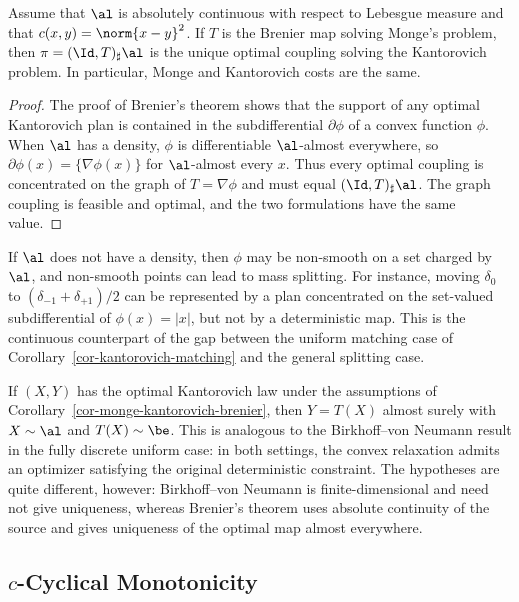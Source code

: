 \begin{cor}\label{cor-monge-kantorovich-brenier}
	Assume that $\al$ is absolutely continuous with respect to Lebesgue measure and that $c(x,y)=\norm{x-y}^2$. If $T$ is the Brenier map solving Monge's problem, then $\pi=(\Id,T)_\sharp\al$ is the unique optimal coupling solving the Kantorovich problem. In particular, Monge and Kantorovich costs are the same.
\end{cor}
\begin{proof}
	The proof of Brenier's theorem shows that the support of any optimal Kantorovich plan is contained in the subdifferential $\partial\phi$ of a convex function $\phi$. When $\al$ has a density, $\phi$ is differentiable $\al$-almost everywhere, so $\partial\phi(x)=\{\nabla\phi(x)\}$ for $\al$-almost every $x$. Thus every optimal coupling is concentrated on the graph of $T=\nabla\phi$ and must equal $(\Id,T)_\sharp\al$. The graph coupling is feasible and optimal, and the two formulations have the same value.
\end{proof}

If $\al$ does not have a density, then $\phi$ may be non-smooth on a set charged by $\al$, and non-smooth points can lead to mass splitting. For instance, moving $\delta_0$ to $(\delta_{-1}+\delta_{+1})/2$ can be represented by a plan concentrated on the set-valued subdifferential of $\phi(x)=|x|$, but not by a deterministic map. This is the continuous counterpart of the gap between the uniform matching case of Corollary~\ref{cor-kantorovich-matching} and the general splitting case.

\begin{rem}
	If $(X,Y)$ has the optimal Kantorovich law under the assumptions of Corollary~\ref{cor-monge-kantorovich-brenier}, then $Y=T(X)$ almost surely with $X\sim\al$ and $T(X)\sim\be$. This is analogous to the Birkhoff--von Neumann result in the fully discrete uniform case: in both settings, the convex relaxation admits an optimizer satisfying the original deterministic constraint. The hypotheses are quite different, however: Birkhoff--von Neumann is finite-dimensional and need not give uniqueness, whereas Brenier's theorem uses absolute continuity of the source and gives uniqueness of the optimal map almost everywhere.
\end{rem}

\subsection{\texorpdfstring{$c$}{c}-Cyclical Monotonicity}
\label{sec-cyclical-monotonicity}

